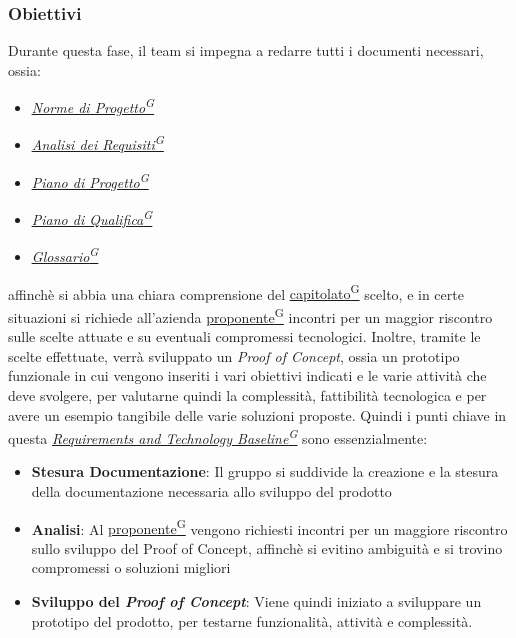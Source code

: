 \documentclass[a4paper,12pt]{article}
\providecommand{\glslink}[2]{\href{https://alittlebyte-19.github.io/Documentazione/glossario.html\#gls-#1}{\underline{#2}\textsuperscript{\scriptsize G}}}
\begin{document}
\subsubsection{Obiettivi}
Durante questa fase, il team si impegna a redarre tutti i documenti necessari, ossia:
\begin{itemize}
    \item \textit{\glslink{norme-di-progetto}{Norme di Progetto}}
    \item \textit{\glslink{analisi-dei-requisiti-adr}{Analisi dei Requisiti}}
    \item \textit{\glslink{piano-di-progetto}{Piano di Progetto}}
    \item \textit{\glslink{piano-di-qualifica}{Piano di Qualifica}}
    \item \textit{\glslink{glossario}{Glossario}}
\end{itemize}
affinchè si abbia una chiara comprensione del \glslink{capitolato}{capitolato} scelto, e in certe situazioni si richiede all'azienda \glslink{committente-proponente}{proponente} incontri per un maggior riscontro sulle scelte attuate e su
eventuali compromessi tecnologici. Inoltre, tramite le scelte effettuate, verrà sviluppato un \textit{Proof of Concept}, ossia un prototipo funzionale in cui vengono inseriti i vari obiettivi indicati e le 
varie attività che deve svolgere, per valutarne quindi la complessità, fattibilità tecnologica e per avere un esempio tangibile delle varie soluzioni proposte.
Quindi i punti chiave in questa \textit{\glslink{rtb-requirements-and-technology-baseline}{Requirements and Technology Baseline}} sono essenzialmente:
\begin{itemize}
    \item \textbf{Stesura Documentazione}: Il gruppo si suddivide la creazione e la stesura della documentazione necessaria allo sviluppo del prodotto
    \item \textbf{Analisi}: Al \glslink{committente-proponente}{proponente} vengono richiesti incontri per un maggiore riscontro sullo sviluppo del Proof of Concept, affinchè si evitino ambiguità e si trovino compromessi o soluzioni migliori
    \item \textbf{Sviluppo del \textit{Proof of Concept}}: Viene quindi iniziato a sviluppare un prototipo del prodotto, per testarne funzionalità, attività e complessità.
\end{itemize}
\end{document}
